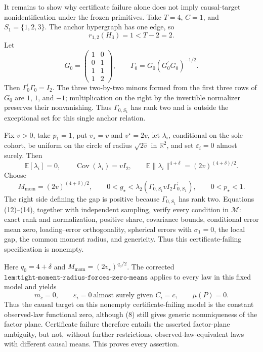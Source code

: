 It remains to show why certificate failure alone does not imply causal-target nonidentification under the frozen primitives. Take \(T=4\), \(C=1\), and \(S_1=\{1,2,3\}\). The anchor hypergraph has one edge, so
\[
r_{1,2}(H_3)=1<T-2=2.
\tag{11}
\]
Let
\[
G_0=
\begin{pmatrix}
1&0\\
0&1\\
1&1\\
1&2
\end{pmatrix},
\qquad
\Gamma_0=G_0(G_0^{\prime}G_0)^{-1/2}.
\tag{12}
\]
Then \(\Gamma_0^{\prime}\Gamma_0=I_2\). The three two-by-two minors formed from the first three rows of \(G_0\) are \(1\), \(1\), and \(-1\); multiplication on the right by the invertible normalizer preserves their nonvanishing. Thus \(\Gamma_{0,S_1}\) has rank two and is outside the exceptional set for this single anchor relation.

Fix \(v>0\), take \(p_1=1\), put \(v_\star=v\) and \(v^{\star}=2v\), let \(\lambda_i\), conditional on the sole cohort, be uniform on the circle of radius \(\sqrt{2v}\) in \(\mathbb R^2\), and set \(\varepsilon_i=0\) almost surely. Then
\[
\mathbb E[\lambda_i]=0,
\qquad
\operatorname{Cov}(\lambda_i)=vI_2,
\qquad
\mathbb E\|\lambda_i\|^{4+\delta}=(2v)^{(4+\delta)/2}.
\tag{13}
\]
Choose
\[
M_{\mathrm{mom}}=(2v)^{(4+\delta)/2},
\qquad
0<g_\star<\lambda_2(\Gamma_{0,S_1}vI_2\Gamma_{0,S_1}^{\prime}),
\qquad
0<p_\star<1.
\tag{14}
\]
The right side defining the gap is positive because \(\Gamma_{0,S_1}\) has rank two. Equations (12)--(14), together with independent sampling, verify every condition in \(\mathcal M\): exact rank and normalization, positive share, covariance bounds, conditional error mean zero, loading--error orthogonality, spherical errors with \(\sigma_1=0\), the local gap, the common moment radius, and genericity. Thus this certificate-failing specification is nonempty.

Here \(q_0=4+\delta\) and \(M_{\mathrm{mom}}=(2v_\star)^{q_0/2}\). The corrected \(\texttt{lem:tight-moment-radius-forces-zero-means}\) applies to every law in this fixed model and yields
\[
m_c=0,
\qquad
\varepsilon_i=0\ \text{almost surely given }C_i=c,
\qquad
\mu(P)=0.
\tag{15}
\]
Thus the causal target on this nonempty certificate-failing model is the constant observed-law functional zero, although (8) still gives generic nonuniqueness of the factor plane. Certificate failure therefore entails the asserted factor-plane ambiguity, but not, without further restrictions, observed-law-equivalent laws with different causal means. This proves every assertion.

